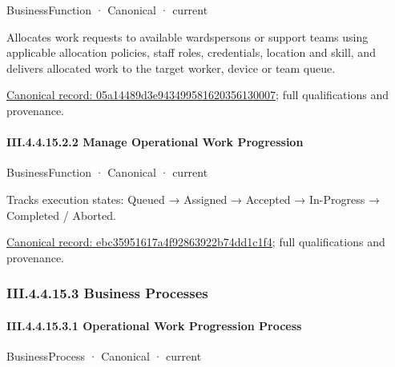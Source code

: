 \label{element:05a14489d3e943499581620356130007}
{\small BusinessFunction · Canonical · current}\par

Allocates work requests to available wardspersons or support teams using applicable allocation policies, staff roles, credentials, location and skill, and delivers allocated work to the target worker, device or team queue.


{\footnotesize \href{../../../../../../../continuum/business/business-function/05a14489d3e943499581620356130007.md}{Canonical record: 05a14489d3e943499581620356130007}; full qualifications and provenance.}\par
\paragraph*{III.4.4.15.2.2 Manage Operational Work Progression}
\label{navigation:III.4.4.15.2.2}

\label{element:ebc35951617a4f92863922b74dd1c1f4}
{\small BusinessFunction · Canonical · current}\par

Tracks execution states: Queued → Assigned → Accepted → In-Progress → Completed / Aborted.


{\footnotesize \href{../../../../../../../continuum/business/business-function/ebc35951617a4f92863922b74dd1c1f4.md}{Canonical record: ebc35951617a4f92863922b74dd1c1f4}; full qualifications and provenance.}\par
\subsubsection*{III.4.4.15.3 Business Processes}
\label{navigation:III.4.4.15.3}

\paragraph*{III.4.4.15.3.1 Operational Work Progression Process}
\label{navigation:III.4.4.15.3.1}

\label{element:5ebba522194b4de5a5b3963e855d712d}
{\small BusinessProcess · Canonical · current}\par

